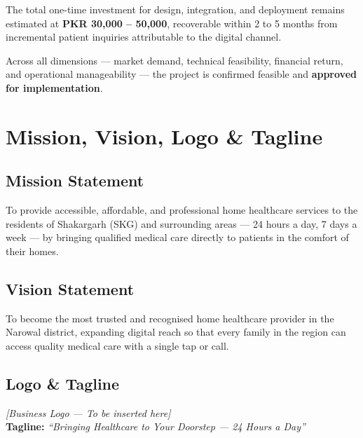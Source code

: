 \documentclass[12pt, a4paper]{article}
\begin{document}
The total one-time investment for design, integration, and deployment remains estimated at \textbf{PKR 30,000 -- 50,000}, recoverable within 2 to 5 months from incremental patient inquiries attributable to the digital channel.

Across all dimensions — market demand, technical feasibility, financial return, and operational manageability — the project is confirmed feasible and \textbf{approved for implementation}.

\newpage
\pagestyle{fancy}
\setcounter{page}{1}

\section*{Mission, Vision, Logo \& Tagline}

\subsection*{Mission Statement}
To provide accessible, affordable, and professional home healthcare services to the residents of Shakargarh (SKG) and surrounding areas --- 24 hours a day, 7 days a week --- by bringing qualified medical care directly to patients in the comfort of their homes.

\subsection*{Vision Statement}
To become the most trusted and recognised home healthcare provider in the Narowal district, expanding digital reach so that every family in the region can access quality medical care with a single tap or call.

\subsection*{Logo \& Tagline}

\begin{center}
\textit{[Business Logo — To be inserted here]}\\[8pt]
\textbf{Tagline:} \textit{``Bringing Healthcare to Your Doorstep — 24 Hours a Day''}
\end{center}
\end{document}
